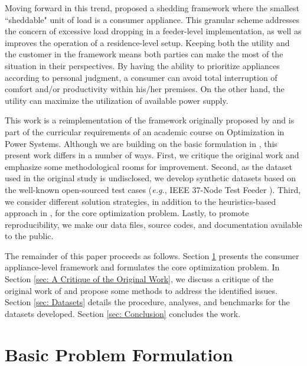 \documentclass[journal, a4paper]{IEEEtran}
\begin{document}
Moving forward in this trend, \cite{Jabian2020} proposed a shedding framework where the smallest ``sheddable" unit of load is a consumer appliance.
This granular scheme addresses the concern of excessive load dropping in a feeder-level implementation,
as well as improves the operation of a residence-level setup.
Keeping both the utility and the customer in the framework means both parties can make the most of the situation in their perspectives.
By having the ability to prioritize appliances according to personal judgment, a consumer can avoid total interruption of comfort and/or productivity within his/her premises.
On the other hand, the utility can maximize the utilization of available power supply.

This work is a reimplementation of the framework originally proposed by \cite{Jabian2020}
and is part of the curricular requirements of an academic course on Optimization in Power Systems.
Although we are building on the basic formulation in \cite{Jabian2020},
this present work differs in a number of ways.
First, we critique the original work and emphasize some methodological rooms for improvement.
Second, as the dataset used in the original study is undisclosed,
we develop synthetic datasets based on the well-known open-sourced test cases
(\textit{e.g.}, IEEE 37-Node Test Feeder \cite{Kersting2001}).
Third, we consider different solution strategies,
in addition to the heuristics-based approach in \cite{Jabian2020},
for the core optimization problem.
Lastly, to promote reproducibility, we make our data files, source codes, and documentation available to the public.

The remainder of this paper proceeds as follows.
Section \ref{sec: Basic Problem Formulation} presents the consumer appliance-level framework
and formulates the core optimization problem.
In Section \ref{sec: A Critique of the Original Work}, we discuss a critique of the original work of \cite{Jabian2020}
and propose some methods to address the identified issues.
Section \ref{sec: Datasets} details the procedure, analyses, and benchmarks for the datasets developed.
Section \ref{sec: Conclusion} concludes the work.

\section{Basic Problem Formulation}
\label{sec: Basic Problem Formulation}
\end{document}
